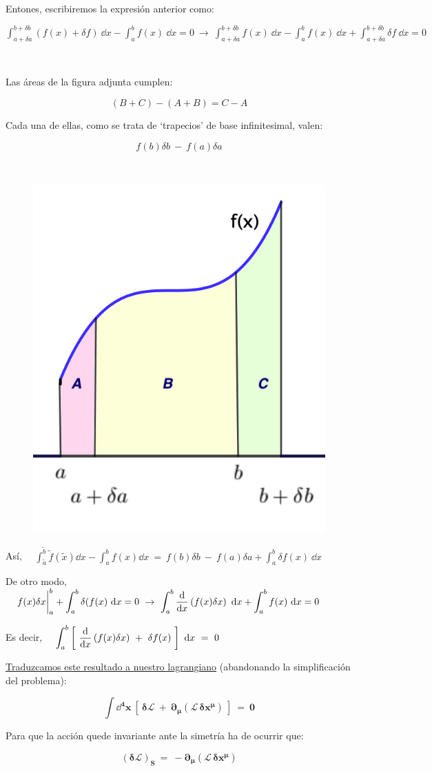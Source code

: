 Entones, escribiremos la expresión anterior como:

$\displaystyle \int_{a+\delta a}^{b+\delta b} (f(x)+\delta f) \ \dd x - \int_a^b f(x) \ \dd x=0 \ \to \ \displaystyle \int_{a+\delta a}^{b+\delta b} f(x) \ \dd x 
- \int_a^b f(x) \ \dd x +
\displaystyle \int_{a+\delta a}^{b+\delta b} \delta f \ \dd x=0$

\vspace{5mm}
\begin{multicols}{2}
$\quad$ 

Las áreas de la figura adjunta cumplen:

$$(B+C)-(A+B)=C-A$$

Cada una de ellas, como se trata de `trapecios' de base infinitesimal, valen: 

$$f(b)\delta b \ - \ f(a)\delta a$$

$\quad$ 
\begin{figure}[H]
	\centering
	\includegraphics[width=.20\textwidth]{imagenes/img35-03.png}
\end{figure}
\end{multicols}

Así, $\quad \displaystyle \int_{\tilde a}^{\tilde b} \tilde f(\tilde x)\dd x-\int_a^b f(x)\dd x \ = \ f(b)\delta b \ - \ f(a)\delta a + \int_a^b \delta f(x) \ \dd x$

De otro modo, $\quad \displaystyle \eval{f(x)\delta x}_a^b + \int_a^b \delta (f(x) \ \dd x = 0 \ \to \ \int_a^b \dv{x} \left( f(x)\delta x \right) \ \dd x+ \int_a^b f(x)\ \dd x =0$

Es decir, $\quad \displaystyle \int_a^b \left[ \ \dv{x} \left( f(x)\delta x \right) \ + \ \delta f(x) \ \right] \ \dd x \ = \ 0$

\underline{Traduzcamos este resultado a nuestro lagrangiano} (abandonando la simplificación del problema):

$$\displaystyle \boldsymbol{ \int \dd^4 x \ [ \ \delta \mathcal L \ + \ \partial_\mu (\mathcal L \, \delta x^\mu) \ ] \ = \ 0 }$$

Para que la acción quede invariante ante la simetría ha de ocurrir que:

$$\boldsymbol{ \boxed{ \ (\delta \mathcal L)_S \ = \ -\partial_\mu (\mathcal L \, \delta x^\mu) \ } }$$

